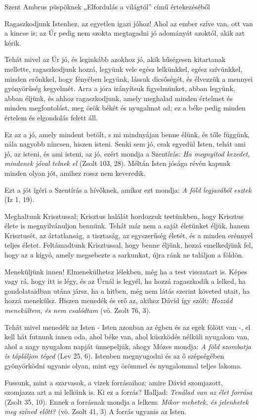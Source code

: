 \documentclass[twoside]{article}
\begin{document}
Szent Ambrus püspöknek „Elfordulás a világtól” című értekezéséből

{\centering{}}

\begin{lectio}{Ragaszkodjunk Istenhez, az egyetlen igazi jóhoz!}
\noindent Ahol az ember szíve van, ott van a kincse is; az Úr pedig nem szokta megtagadni jó %
adományát azoktól, akik azt kérik.

Tehát mivel az Úr jó, és leginkább azokhoz jó, akik hűségesen kitartanak mellette, ragaszkodjunk %
hozzá, legyünk vele egész lelkünkkel, egész szívünkkel, minden erőnkkel, hogy fényében legyünk, %
lássuk dicsőségét, és élvezzük a mennyei gyönyörűség kegyelmét. Arra a jóra irányítsuk %
figyelmünket, abban legyünk, abban éljünk, és ahhoz ragaszkodjunk, amely meghalad minden értelmet %
és minden megfontolást, meg örök békét és nyugalmat ad; ez a béke pedig minden értelem és %
elgondolás felett áll.

Ez az a jó, amely mindent betölt, s mi mindnyájan benne élünk, és tőle függünk, nála nagyobb %
nincsen, hiszen isteni. Senki sem jó, csak egyedül Isten, tehát ami jó, az isteni, és ami isteni, %
az jó, ezért mondja a Szentírás: \textit{Ha megnyitod kezedet, mindenek jóval telnek el} (Zsolt %
103, 28). Méltán Isten jósága révén kapunk minden olyan jót, amihez rossz nem keveredik.

Ezt a jót ígéri a Szentírás a hívőknek, amikor ezt mondja: \textit{A föld legjavából esztek} (Iz %
1, 19).

Meghaltunk Krisztussal; Krisztus halálát hordozzuk testünkben, hogy Krisztus élete is %
megnyilvánuljon bennünk. Tehát már nem a saját életünket éljük, hanem Krisztusét, az ártatlanság, %
a tisztaság, az egyszerűség életét, és a minden erénnyel teljes életet. Feltámadtunk Krisztussal, %
hogy benne éljünk, hozzá emelkedjünk fel, hogy az a kígyó, amely megsebezte a sarkunkat, újra ránk %
ne találjon a földön.

Meneküljünk innen! Elmenekülhetsz lélekben, még ha a test visszatart is. Képes vagy rá, hogy itt %
is légy, és az Úrnál is legyél, ha hozzá ragaszkodik a lelked, ha gondolataidban utána jársz, ha a %
hitben, még nem látás szerint követed utait, ha hozzá menekülsz. Hiszen menedék és erő az, akihez %
Dávid így szólt: \textit{Hozzád menekültem, és nem csalódtam} (vö. Zsolt 76, 3).

Tehát mivel menedék az Isten - Isten azonban az égben és az egek fölött van -, el kell hát futnunk %
innen oda, ahol béke van, ahol küszködés nélküli nyugalom van, ahol a nagy nyugalom napját %
ünnepeljük, ahogy Mózes mondja: \textit{A föld szombatja is tápláljon téged} (Lev 25, 6). Istenben %
megnyugodni és az ő szépségében gyönyörködni ugyanis olyan, mint egy örömmel és nyugalommal teljes %
lakoma.

Fussunk, mint a szarvasok, a vizek forrásaihoz; amire Dávid szomjazott, szomjazza azt a mi lelkünk %
is. Ki ez a forrás? Halljad: \textit{Tenálad van az élet forrása} (Zsolt 35, 10). Ennek a %
forrásnak mondja a lelkem: \textit{Mikor mehetek, és jelenhetek meg színed előtt?} (vö. Zsolt 41, %
3) A forrás ugyanis az Isten.
\end{lectio}
\end{document}
